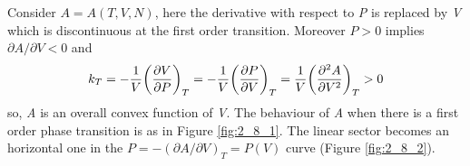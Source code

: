 \documentclass[../main/main.tex]{subfiles}
\begin{document}
Consider \( A = A (T,V,N) \), here the derivative with respect to \emph{P} is replaced by \emph{V} which is discontinuous at the first order transition. Moreover \( P > 0 \)  implies \( \partial{A}/\partial{V} < 0   \) and
\begin{equation}
  k_T = -\frac{1}{V} \qty(\pdv{V}{P} )_T = -\frac{1}{V} \qty(\pdv{P}{V} )_T = \frac{1}{V} \qty(\pdv[2]{A}{V} )_T > 0
  \label{eq:}
\end{equation}
so, \emph{A} is an overall convex function of \emph{V}.
The behaviour of \emph{A} when there is a first order phase transition is as in Figure \ref{fig:2_8_1}. The linear sector becomes an horizontal one in the \( P = - (\partial{A}/\partial{V}  )_T = P (V) \) curve (Figure \ref{fig:2_8_2}).
\end{document}

